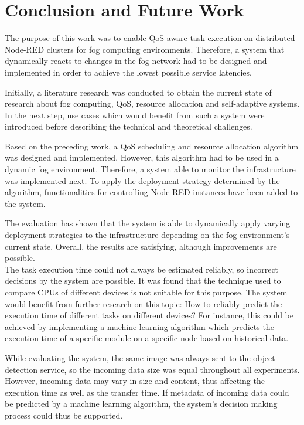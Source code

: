 \clearpage
\chapter{Conclusion and Future Work}

The purpose of this work was to enable QoS-aware task execution on distributed Node-RED clusters for fog computing environments.
Therefore, a system that dynamically reacts to changes in the fog network had to be designed and implemented in order to achieve the lowest possible service latencies.

Initially, a literature research was conducted to obtain the current state of research about fog computing, QoS, resource allocation and self-adaptive systems.
In the next step, use cases which would benefit from such a system were introduced before describing the technical and theoretical challenges.

Based on the preceding work, a QoS scheduling and resource allocation algorithm was designed and implemented.
However, this algorithm had to be used in a dynamic fog environment.
Therefore, a system able to monitor the infrastructure was implemented next.
To apply the deployment strategy determined by the algorithm, functionalities for controlling Node-RED instances have been added to the system.

The evaluation has shown that the system is able to dynamically apply varying deployment strategies to the infrastructure depending on the fog environment's current state.
Overall, the results are satisfying, although improvements are possible.\\


The task execution time could not always be estimated reliably, so incorrect decisions by the system are possible.
It was found that the technique used to compare CPUs of different devices is not suitable for this purpose.
The system would benefit from further research on this topic:
How to reliably predict the execution time of different tasks on different devices?
For instance, this could be achieved by implementing a machine learning algorithm which predicts the execution time of a specific module on a specific node based on historical data.

While evaluating the system, the same image was always sent to the object detection service, so the incoming data size was equal throughout all experiments.
However, incoming data may vary in size and content, thus affecting the execution time as well as the transfer time.
If metadata of incoming data could be predicted by a machine learning algorithm, the system's decision making process could thus be supported.


